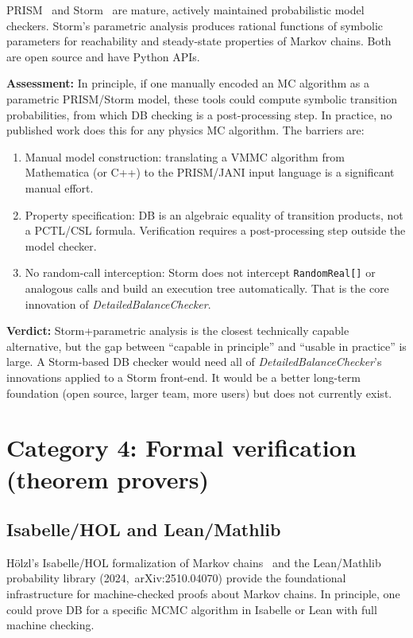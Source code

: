 \documentclass[11pt,a4paper]{article}
\newcommand{\DBC}{\textit{DetailedBalanceChecker}}
\begin{document}
PRISM~\cite{Kwiatkowska2011} and Storm~\cite{Dehnert2017} are mature, actively
maintained probabilistic model checkers.  Storm's parametric analysis produces
rational functions of symbolic parameters for reachability and steady-state
properties of Markov chains.  Both are open source and have Python APIs.

\textbf{Assessment:}  In principle, if one manually encoded an MC algorithm as a
parametric PRISM/Storm model, these tools could compute symbolic transition
probabilities, from which DB checking is a post-processing step.  In practice, no
published work does this for any physics MC algorithm.  The barriers are:
\begin{enumerate}[nosep]
  \item Manual model construction: translating a VMMC algorithm from Mathematica
    (or C++) to the PRISM/JANI input language is a significant manual effort.
  \item Property specification: DB is an algebraic equality of transition products,
    not a PCTL/CSL formula.  Verification requires a post-processing step outside
    the model checker.
  \item No random-call interception: Storm does not intercept \texttt{RandomReal[]}
    or analogous calls and build an execution tree automatically.  That is the
    core innovation of \DBC{}.
\end{enumerate}

\textbf{Verdict:}  Storm+parametric analysis is the closest technically capable
alternative, but the gap between ``capable in principle'' and ``usable in practice''
is large.  A Storm-based DB checker would need all of \DBC{}'s innovations applied
to a Storm front-end.  It would be a better long-term foundation (open source,
larger team, more users) but does not currently exist.

\section{Category 4: Formal verification (theorem provers)}
\label{sec:formal}

\subsection{Isabelle/HOL and Lean/Mathlib}

Hölzl's Isabelle/HOL formalization of Markov chains~\cite{Holzl2017} and the
Lean/Mathlib probability library (2024,~arXiv:2510.04070) provide the foundational
infrastructure for machine-checked proofs about Markov chains.  In principle, one
could prove DB for a specific MCMC algorithm in Isabelle or Lean with full machine
checking.
\end{document}
